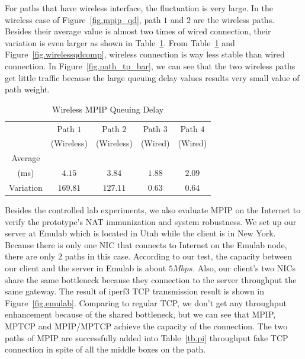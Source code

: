 For paths that have wireless interface, the fluctuation is very large. In the wireless case of Figure~\ref{fig.mpip_qd}, path $1$ and $2$ are the wireless paths. Besides their average value is almost two times of wired connection, their variation is even larger as shown in Table~\ref{tb.wireless}. From Table~\ref{tb.wireless} and Figure~\ref{fig.wirelessqdcomp}, wireless connection is way less stable than wired connection. In Figure~\ref{fig.path_tp_bar}, we can see that the two wireless paths get little traffic because the large queuing delay values results very small value of path weight.


\begin{table}
\caption{\label{tb.wireless}Wireless MPIP Queuing Delay}
\centering
\begin{tabular}{|c|c|c|c|c|}
\hline
  & Path $1$   &  Path $2$   &  Path $3$ &  Path $4$\\
  & (Wireless) &  (Wireless) &  (Wired)  &  (Wired) \\
\hline
Average &   &   &   & \\
(ms) & $4.15$ & $3.84$ & $1.88$ & $2.09$ \\
\hline
Variation  & $169.81$ & $127.11$ & $0.63$ & $0.64$ \\
\hline
\end{tabular}
\end{table}

%

Besides the controlled lab experiments, we also evaluate MPIP on the Internet to verify the prototype's NAT immunization and system robustness. We set up our server at Emulab\cite{emulab} which is located in Utah while the client is in New York. Because there is only one NIC that connects to Internet on the Emulab node, there are only $2$ paths in this case. According to our test, the capacity between our client and the server in Emulab is about $5Mbps$. Also, our client's two NICs share the same bottleneck because they connection to the server throughput the same gateway. The result of iperf3 TCP transmission result is shown in Figure~\ref{fig.emulab}. Comparing to regular TCP, we don't get any throughput enhancement because of the shared bottleneck, but we can see that MPIP, MPTCP and MPIP/MPTCP achieve the capacity of the connection. The two paths of MPIP are successfully added into Table~\ref{tb.pi} throughput fake TCP connection in spite of all the middle boxes on the path.


